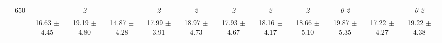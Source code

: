 \begin{table}[h]
{\begin{tabular}{
        ccccccccccccc}
 & \multirow{2}{*}{650}& & \textit{ 2 }& & \textit{ 2 }& \textit{ 2 }& \textit{ 2 }& \textit{ 2 }& \textit{ 2 }& \textit{ 0 2 }& & \textit{ 0 2 } \\ 
 & & 16.63 $\pm$ 4.45& 19.19 $\pm$ 4.80& 14.87 $\pm$ 4.28& 17.99 $\pm$ 3.91& 18.97 $\pm$ 4.73& 17.93 $\pm$ 4.67& 18.16 $\pm$ 4.17& 18.66 $\pm$ 5.10& 19.87 $\pm$ 5.35& 17.22 $\pm$ 4.27& 19.22 $\pm$ 4.38 \\ \midrule 

        \bottomrule
        \end{tabular}%
        }

        \end{table}
        

